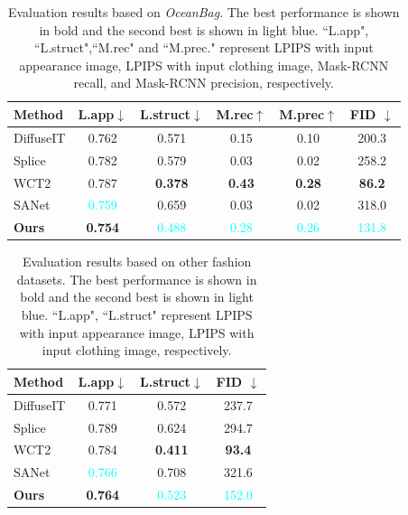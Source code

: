 \begin{table}[!t]
\begin{center}
\caption{Evaluation results based on \textit{OceanBag}. The best performance is shown in bold and the second best is shown in light blue. ``L.app", ``L.struct",``M.rec" and ``M.prec." represent LPIPS with input appearance image, LPIPS with input clothing image, Mask-RCNN recall, and Mask-RCNN precision, respectively.}
\begin{tabular}{l|c c c c c}
     	\toprule
         Method & L.app$\downarrow$ & L.struct$\downarrow$ & M.rec$\uparrow$ & M.prec$\uparrow$& FID $\downarrow$  \\
          \midrule
          DiffuseIT &0.762&0.571
           & 0.15 &0.10 &200.3\\

          Splice &0.782& 0.579&  0.03&0.02& 258.2\\
          WCT2 &0.787&\textbf{0.378} & \textbf{0.43}  &\textbf{0.28}&\textbf{86.2} \\
          SANet &\textcolor{cyan}{0.759} &0.659& 0.03 &0.02&318.0\\
          \textbf{Ours}   &\textbf{0.754} &\textcolor{cyan}{0.488}    &  \textcolor{cyan}{0.28}& \textcolor{cyan}{0.26}&
          \textcolor{cyan}{131.8}\\
          \bottomrule
\end{tabular}
\label{res_bag}
\end{center}
\end{table}

\begin{table}[!t]
\begin{center}
\caption{Evaluation results based on other fashion datasets. The best performance is shown in bold and the second best is shown in light blue. ``L.app", ``L.struct" represent LPIPS with input appearance image, LPIPS with input clothing image,  respectively.}
\begin{tabular}{l|c c c}
     	\toprule
         Method & L.app$\downarrow$ & L.struct$\downarrow$ & FID $\downarrow$  \\
          \midrule
          DiffuseIT &0.771&0.572
           &237.7\\

          Splice &0.789& 0.624& 294.7\\
          WCT2 &0.784&\textbf{0.411} &\textbf{93.4} \\
          SANet &\textcolor{cyan}{0.766} &0.708& 321.6 \\
          \textbf{Ours}   &\textbf{0.764} &\textcolor{cyan}{0.523}    &  \textcolor{cyan}{152.0}\\
          \bottomrule
\end{tabular}
\label{res_clo}
\end{center}
\end{table}

